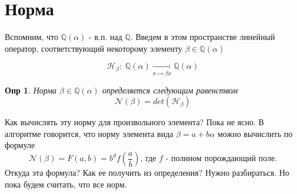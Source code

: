 \documentclass[oneside,final,14pt]{extreport}
\theoremstyle{plain}
\begin{document}
\section{Норма}


Вспомним, что $\mathbb{Q}(\alpha)$ - в.п. над $\mathbb{Q}$. Введем в этом пространстве линейный оператор, соответствующий некоторому элементу $\beta \in \mathbb{Q}(\alpha)$

\[
\mathcal{H}_{\beta}: \;\mathbb{Q}(\alpha) \xrightarrow[x \mapsto \beta x]{} \mathbb{Q}(\alpha)
\]

\newtheorem*{def*}{Опр}
\begin{def*}
Норма $\beta \in \mathbb{Q}(\alpha) $ определяется следующим равенством
$$\mathcal{N}(\beta)=det(\mathcal{H}_{\beta})$$
\end{def*}


Как вычислять эту норму для произвольного элемента? Пока не ясно. В алгоритме говорится, что норму элемента вида $\beta=a+b \alpha$ можно вычислить по формуле
$$
\mathcal{N}(\beta)=F(a,b) = b^df(\frac{a}{b}) \text{, где } f \text{ - полином порождающий поле.}
$$ 
Откуда эта формула? Как ее получить из определения? Нужно разбираться. Но пока будем считать, что все норм.
\end{document}
